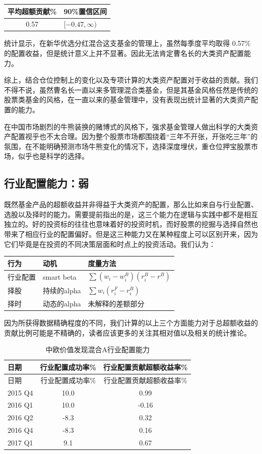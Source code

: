 \documentclass[hyperref,]{ctexart}
\begin{document}
\begin{longtable}[]{@{}cl@{}}
\toprule
平均超额贡献\% & 90\%置信区间\tabularnewline
\midrule
\endhead
0.57 & \([-0.47,\infty)\)\tabularnewline
\bottomrule
\end{longtable}

统计显示，在新华优选分红混合这支基金的管理上，虽然每季度平均取得 0.57\%
的配置收益，但是统计意义上并不显著。因此无法肯定曹名长的大类资产配置能力。

综上，结合仓位控制上的变化以及专项计算的大类资产配置对于收益的贡献。我们不得不说，虽然曹名长一直以来多管理混合类基金，但是其基金风格任然是传统的股票类基金的风格，在一直以来的基金管理中，没有表现出统计显著的大类资产配置的能力。

在中国市场剧烈的牛熊装换的赌博式的风格下，强求基金管理人做出科学的大类资产配置视乎也不太合理。因为整个股票市场都围绕着``三年不开张，开张吃三年''的氛围，在不能明确预测市场牛熊变化的情况下，选择深度埋伏，重仓位押宝股票市场，似乎也是科学的选择。

\subsection{行业配置能力：弱}

既然基金产品的超额收益并非得益于大类资产的配置，那么比如来自与行业配置、选股以及择时的能力。需要提前指出的是，这三个能力在逻辑与实践中都不是相互独立的。好的投资标的往往也意味着好的投资时机，而好股票的挖掘与选择自然也带来了相应行业的配置偏好。但是这三种能力又在某种程度上可以区别开来，因为它们毕竟是在投资的不同决策层面和时点上的投资活动。我们认为：

\begin{longtable}[]{@{}lll@{}}
\toprule
行为 & 动机 & 度量方法\tabularnewline
\midrule
\endhead
行业配置 & smart beta & \(\sum(w_i-w_i^B)(r_i^B-r^B)\)\tabularnewline
择股 & 持续的alpha & \(\sum w_{i}(r_{i}^F-r_{i}^B)\)\tabularnewline
择时 & 动态的alpha & 未解释的差额部分\tabularnewline
\bottomrule
\end{longtable}

因为所获得数据精确程度的不同，我们计算的以上三个方面能力对于总超额收益的贡献比例可能是不精确的，读者应该更多的关注其相对值以及相关的统计推论。

\begin{longtable}[]{@{}lcc@{}}
\caption{中欧价值发现混合A行业配置能力}\tabularnewline
\toprule
日期 & 行业配置成功率\% & 行业配置贡献超额收益率\%\tabularnewline
\midrule
\endfirsthead
\toprule
日期 & 行业配置成功率\% & 行业配置贡献超额收益率\%\tabularnewline
\midrule
\endhead
2015 Q4 & 10.0 & 0.99\tabularnewline
2016 Q1 & 10.0 & -0.16\tabularnewline
2016 Q2 & -8.3 & 0.32\tabularnewline
2016 Q4 & -8.3 & 0.16\tabularnewline
2017 Q1 & 9.1 & 0.67\tabularnewline
\bottomrule
\end{longtable}
\end{document}
